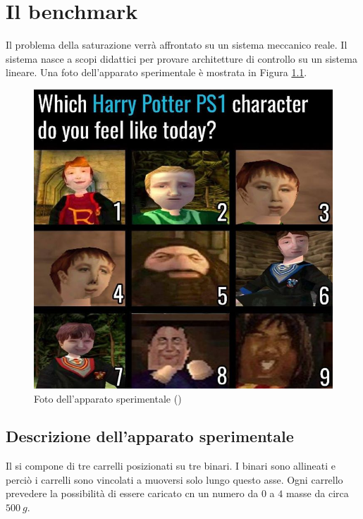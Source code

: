 \chapter{Il benchmark}
Il problema della saturazione verrà affrontato su un sistema meccanico reale. Il sistema nasce a scopi didattici per provare architetture di controllo su un sistema lineare. Una foto dell'apparato sperimentale è mostrata in Figura \ref{fig:fotosetup}.
\begin{figure}
	\centering
	\includegraphics[height=0.5\linewidth]{img/foto_setup}
	\caption{Foto dell'apparato sperimentale (\treM)}
	\label{fig:fotosetup}
\end{figure}
\section{Descrizione dell'apparato sperimentale}
Il \treM si compone di tre carrelli posizionati su tre binari. I binari sono allineati e perciò i carrelli sono vincolati a muoversi solo lungo questo asse. Ogni carrello prevedere la possibilità di essere caricato cn un numero da $0$ a $4$ masse da circa $500 \ g$.



